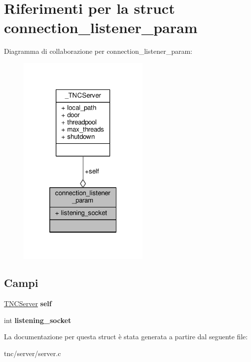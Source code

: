 \hypertarget{structconnection__listener__param}{}\section{Riferimenti per la struct connection\+\_\+listener\+\_\+param}
\label{structconnection__listener__param}


Diagramma di collaborazione per connection\+\_\+listener\+\_\+param\+:
\nopagebreak
\begin{figure}[H]
\begin{center}
\leavevmode
\includegraphics[width=181pt]{structconnection__listener__param__coll__graph}
\end{center}
\end{figure}
\subsection*{Campi}
\begin{DoxyCompactItemize}
\item 
\hypertarget{structconnection__listener__param_aad5466009071df3736fb096531877cdd}{}\hyperlink{struct__TNCServer}{T\+N\+C\+Server} {\bfseries self}\label{structconnection__listener__param_aad5466009071df3736fb096531877cdd}

\item 
\hypertarget{structconnection__listener__param_abe71c700bee99698b4d058b32e7e6d8a}{}int {\bfseries listening\+\_\+socket}\label{structconnection__listener__param_abe71c700bee99698b4d058b32e7e6d8a}

\end{DoxyCompactItemize}


La documentazione per questa struct è stata generata a partire dal seguente file\+:\begin{DoxyCompactItemize}
\item 
tnc/server/server.\+c\end{DoxyCompactItemize}
